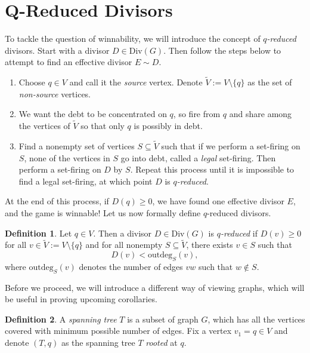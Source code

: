 \documentclass[openany, amssymb, psamsfonts]{amsart}
\theoremstyle{definition}
\newtheorem{defn}{Definition}[section]
\numberwithin{equation}{section}
\begin{document}
\section{Q-Reduced Divisors}
\label{5}

To tackle the question of winnability, we will introduce the concept of $q$\textit{-reduced} divisors. Start with a divisor $D\in \text{Div}(G)$. Then follow the steps below to attempt to find an effective divisor $E\sim D$. 

\begin{enumerate}
    \item Choose $q\in V$ and call it the \textit{source} vertex. Denote $\tilde{V}:=V\setminus \{q\}$ as the set of \textit{non-source} vertices.
    \item We want the debt to be concentrated on $q$, so fire from $q$ and share among the vertices of $\tilde{V}$ so that only $q$ is possibly in debt.
    \item Find a nonempty set of vertices $S\subseteq \tilde{V}$ such that if we perform a set-firing on $S$, none of the vertices in $S$ go into debt, called a \textit{legal} set-firing. Then perform a set-firing on $D$ by $S$. Repeat this process until it is impossible to find a legal set-firing, at which point $D$ is $q$\textit{-reduced}.
\end{enumerate}

At the end of this process, if $D(q)\geq 0$, we have found one effective divisor $E$, and the game is winnable! Let us now formally define $q$-reduced divisors.

\begin{defn}
\label{defn 5.1}
Let $q\in V$. Then a divisor $D\in \text{Div}(G)$ is $q$\textit{-reduced} if $D(v)\geq 0$ for all $v\in \tilde{V}:=V\setminus \{q\}$ and for all nonempty $S\subseteq \tilde{V}$, there exists $v\in S$ such that 
\[D(v)<\text{outdeg}_S(v),\]
where $\text{outdeg}_S(v)$ denotes the number of edges $vw$ such that $w\notin S$.
\end{defn}

Before we proceed, we will introduce a different way of viewing graphs, which will be useful in proving upcoming corollaries. 

\begin{defn}
\label{defn 5.2}
A \textit{spanning tree} $T$ is a subset of graph $G$, which has all the vertices covered with minimum possible number of edges. Fix a vertex $v_1=q\in V$ and denote $(T,q)$ as the spanning tree $T$ \textit{rooted} at $q$.
\end{defn}
\end{document}
